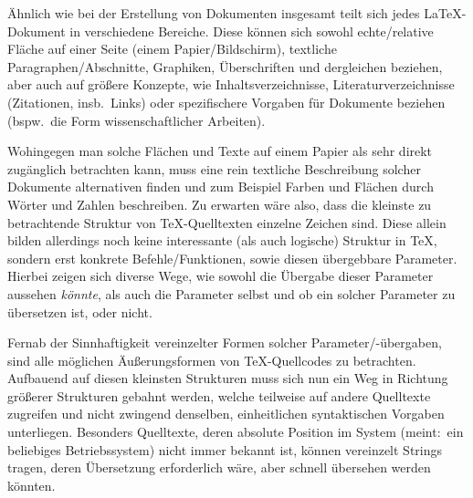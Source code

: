 Ähnlich wie bei der Erstellung von Dokumenten insgesamt teilt sich jedes \LaTeX{}-Dokument in verschiedene Bereiche. Diese können sich sowohl echte/relative Fläche auf einer Seite (einem Papier/Bildschirm), textliche Paragraphen/Abschnitte, Graphiken, Überschriften und dergleichen beziehen, aber auch auf größere Konzepte, wie Inhaltsverzeichnisse, Literaturverzeichnisse (Zitationen, insb.\ Links) oder spezifischere Vorgaben für Dokumente beziehen (bspw.\ die Form wissenschaftlicher Arbeiten).

Wohingegen man solche Flächen und Texte auf einem Papier als sehr direkt zugänglich betrachten kann, muss eine rein textliche Beschreibung solcher Dokumente alternativen finden und zum Beispiel Farben und Flächen durch Wörter und Zahlen beschreiben. Zu erwarten wäre also, dass die kleinste zu betrachtende Struktur von \TeX{}-Quelltexten einzelne Zeichen sind. Diese allein bilden allerdings noch keine interessante (als auch logische) Struktur in \TeX{}, sondern erst konkrete Befehle/Funktionen, sowie diesen übergebbare Parameter. Hierbei zeigen sich diverse Wege, wie sowohl die Übergabe dieser Parameter aussehen \textit{könnte}, als auch die Parameter selbst und ob ein solcher Parameter zu übersetzen ist, oder nicht.

Fernab der Sinnhaftigkeit vereinzelter Formen solcher Parameter/-übergaben, sind alle möglichen Äußerungsformen von \TeX{}-Quellcodes zu betrachten.
Aufbauend auf diesen kleinsten Strukturen muss sich nun ein Weg in Richtung größerer Strukturen gebahnt werden, welche teilweise auf andere Quelltexte zugreifen und nicht zwingend denselben, einheitlichen syntaktischen Vorgaben unterliegen.%
Besonders Quelltexte, deren absolute Position im System (meint:\ ein beliebiges Betriebssystem) nicht immer bekannt ist, können vereinzelt Strings tragen, deren Übersetzung erforderlich wäre, aber schnell übersehen werden könnten.%


